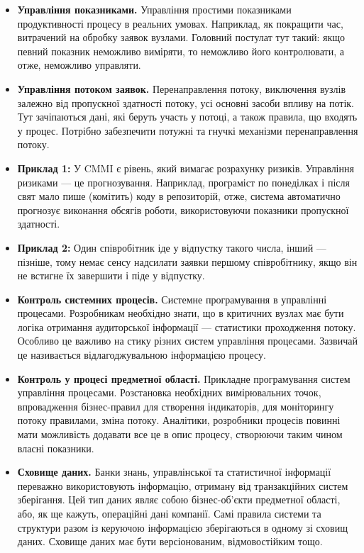 \documentclass{memoir}
\begin{document}
\begin{itemize}
    \item \textbf{Управління показниками.} Управління простими показниками продуктивності процесу в реальних умовах. Наприклад, як покращити час, витрачений на обробку заявок вузлами. Головний постулат тут такий: якщо певний показник неможливо виміряти, то неможливо його контролювати, а отже, неможливо управляти.
    \item \textbf{Управління потоком заявок.} Перенаправлення потоку, виключення вузлів залежно від пропускної здатності потоку, усі основні засоби впливу на потік. Тут зачіпаються дані, які беруть участь у потоці, а також правила, що входять у процес. Потрібно забезпечити потужні та гнучкі механізми перенаправлення потоку.
    \item \textbf{Приклад 1:} У CMMI є рівень, який вимагає розрахунку ризиків. Управління ризиками — це прогнозування. Наприклад, програміст по понеділках і після свят мало пише (комітить) коду в репозиторій, отже, система автоматично прогнозує виконання обсягів роботи, використовуючи показники пропускної здатності.
    \item \textbf{Приклад 2:} Один співробітник іде у відпустку такого числа, інший — пізніше, тому немає сенсу надсилати заявки першому співробітнику, якщо він не встигне їх завершити і піде у відпустку.
    \item \textbf{Контроль системних процесів.} Системне програмування в управлінні процесами. Розробникам необхідно знати, що в критичних вузлах має бути логіка отримання аудиторської інформації — статистики проходження потоку. Особливо це важливо на стику різних систем управління процесами. Зазвичай це називається відлагоджувальною інформацією процесу.
    \item \textbf{Контроль у процесі предметної області.} Прикладне програмування систем управління процесами. Розстановка необхідних вимірювальних точок, впровадження бізнес-правил для створення індикаторів, для моніторингу потоку правилами, зміна потоку. Аналітики, розробники процесів повинні мати можливість додавати все це в опис процесу, створюючи таким чином власні показники.
    \item \textbf{Сховище даних.} Банки знань, управлінської та статистичної інформації переважно використовують інформацію, отриману від транзакційних систем зберігання. Цей тип даних являє собою бізнес-об’єкти предметної області, або, як ще кажуть, операційні дані компанії. Самі правила системи та структури разом із керуючою інформацією зберігаються в одному зі сховищ даних. Сховище даних має бути версіонованим, відмовостійким тощо.
\end{itemize}
\end{document}
